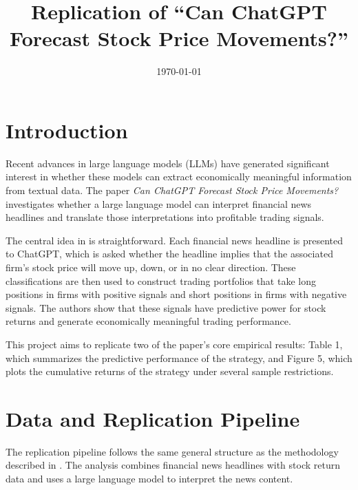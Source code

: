\documentclass[12pt]{article}
\title{Replication of ``Can ChatGPT Forecast Stock Price Movements?'' \cite{LopezLiraTang2023}}
\author{}
\date{\today}
\begin{document}
\maketitle


\section{Introduction}

Recent advances in large language models (LLMs) have generated significant interest in whether these models can extract economically meaningful information from textual data. The paper \emph{Can ChatGPT Forecast Stock Price Movements?} \cite{LopezLiraTang2023} investigates whether a large language model can interpret financial news headlines and translate those interpretations into profitable trading signals.

The central idea in \cite{LopezLiraTang2023} is straightforward. Each financial news headline is presented to ChatGPT, which is asked whether the headline implies that the associated firm's stock price will move up, down, or in no clear direction. These classifications are then used to construct trading portfolios that take long positions in firms with positive signals and short positions in firms with negative signals. The authors show that these signals have predictive power for stock returns and generate economically meaningful trading performance.

This project aims to replicate two of the paper's core empirical results: Table 1, which summarizes the predictive performance of the strategy, and Figure 5, which plots the cumulative returns of the strategy under several sample restrictions.


\section{Data and Replication Pipeline}

The replication pipeline follows the same general structure as the methodology described in \cite{LopezLiraTang2023}. The analysis combines financial news headlines with stock return data and uses a large language model to interpret the news content.
\end{document}
